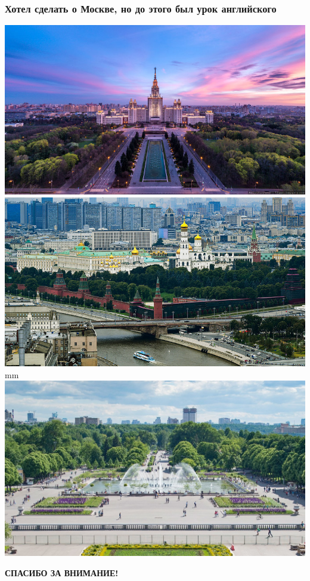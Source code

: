\documentclass{beamer}
\begin{document}
\begin{frame}
\frametitle{Хотел сделать о Москве, но до этого был урок английского}
\includegraphics[width=0.5\linewidth]{moscow01.jpg}
\includegraphics[width=0.5\linewidth]{moscow02.jpg}\\
 mm
\centering\includegraphics[width=0.6\linewidth]{moscow04.jpg}
\end{frame}

\begin{frame}
	\begin{center}
		{\large {\bf СПАСИБО ЗА ВНИМАНИЕ!}  }
	\end{center}
\end{frame}
\end{document}
